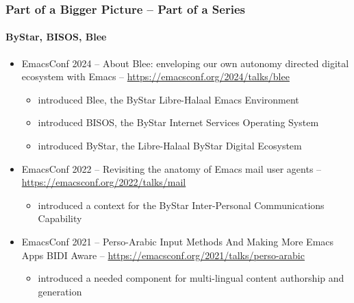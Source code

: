 \begin{whenOrg}
\begin{verblatex}

\begin{frame}[fragile,plain,label=PartOfByStar]
    \frametitle{Part of a Bigger Picture -- Part of a Series}
    \framesubtitle{ByStar, BISOS, Blee}

\begin{itemize}
    \item EmacsConf 2024 -- About Blee: enveloping our own autonomy directed digital ecosystem with Emacs -- \url{https://emacsconf.org/2024/talks/blee}
    \begin{itemize}
      \item introduced Blee, the ByStar Libre-Halaal Emacs Environment
      \item introduced BISOS, the ByStar Internet Services Operating System
      \item introduced ByStar, the Libre-Halaal ByStar Digital Ecosystem
    \end{itemize}
    \item EmacsConf 2022 -- Revisiting the anatomy of Emacs mail user agents -- \url{https://emacsconf.org/2022/talks/mail}
    \begin{itemize}
      \item introduced a context for the ByStar Inter-Personal Communications Capability
    \end{itemize}
    \item EmacsConf 2021 -- Perso-Arabic Input Methods And Making More Emacs Apps BIDI Aware -- \url{https://emacsconf.org/2021/talks/perso-arabic}
    \begin{itemize}
      \item introduced a needed component for multi-lingual content authorship and generation
    \end{itemize}
\end{itemize}

\end{frame}
\end{verblatex}

\end{whenOrg}

